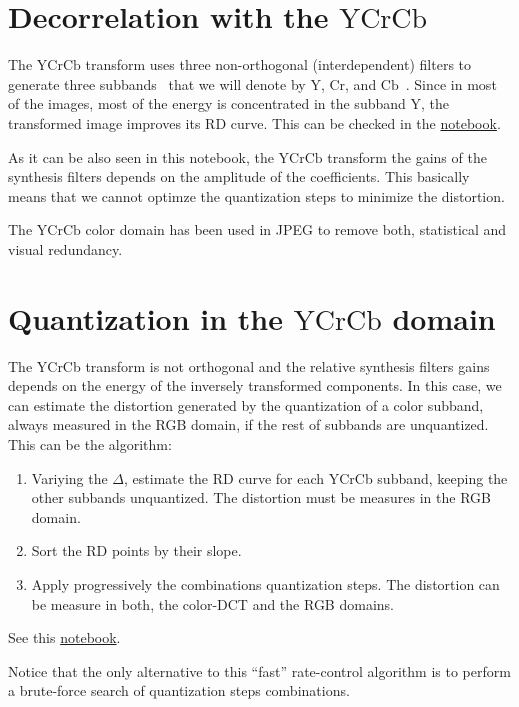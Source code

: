 
\section{Decorrelation with the $\text{YCrCb}$}
The $\text{YCrCb}$ transform uses three non-orthogonal
(interdependent) filters to generate three
subbands~\cite{vruiz__transform_coding} that we will denote by
$\text{Y}$, $\text{Cr}$, and $\text{Cb}$~\cite{vruiz__YCrCb}. Since in
most of the images, most of the energy is concentrated in the subband
$\text{Y}$, the transformed image improves its RD curve. This can be
checked in the
\href{https://github.com/Sistemas-Multimedia/Sistemas-Multimedia.github.io/blob/master/contents/YCrCb_SQ/YCrCb_SQ.ipynb}{notebook}.

As it can be also seen in this notebook, the $\text{YCrCb}$ transform
the gains of the synthesis filters depends on the amplitude of the
coefficients. This basically means that we cannot optimze the
quantization steps to minimize the distortion.

The $\text{YCrCb}$ color domain has been used in JPEG to remove both,
statistical and visual redundancy.

\section{Quantization in the $\text{YCrCb}$ domain}
The YCrCb transform is not orthogonal and the relative synthesis
filters gains depends on the energy of the inversely transformed
components. In this case, we can estimate the distortion generated by
the quantization of a color subband, always measured in the RGB
domain, if the rest of subbands are unquantized. This can be the
algorithm:
\begin{enumerate}
\item Variying the $\Delta$, estimate the RD curve for each YCrCb
  subband, keeping the other subbands unquantized. The distortion must
  be measures in the RGB domain.
\item Sort the RD points by their slope.
\item Apply progressively the combinations quantization steps. The
  distortion can be measure in both, the color-DCT and the RGB
  domains.
\end{enumerate}
See this \href{https://github.com/Sistemas-Multimedia/Sistemas-Multimedia.github.io/blob/master/study_guide/06-color_transform/YCrCb_compression.ipynb}{notebook}.

Notice that the only alternative to this ``fast'' rate-control
algorithm is to perform a brute-force search of quantization steps
combinations.

